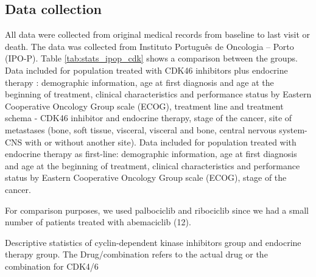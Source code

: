 \subsection{Data collection}
All data were collected from original medical records from baseline to last visit or death.
The data was collected from Instituto Português de Oncologia – Porto (IPO-P).  Table \ref{tab:stats_ipop_cdk} shows a comparison between the groups.
Data included for population treated with CDK4\/6 inhibitors plus endocrine therapy : demographic information, age at first diagnosis and age at the beginning of treatment, clinical characteristics and performance status by Eastern Cooperative Oncology Group scale (ECOG), treatment line and treatment schema -  CDK4\/6 inhibitor and endocrine therapy, stage of the cancer, site of metastases (bone, soft tissue, visceral, visceral and bone, central nervous system-CNS with or without another site).
Data included for population treated with endocrine therapy as first-line: demographic information, age at first diagnosis and age at the beginning of treatment, clinical characteristics and performance status by Eastern Cooperative Oncology Group scale (ECOG),  stage of the cancer.

For comparison purposes, we used palbociclib and ribociclib since we had a small number of patients treated with abemaciclib (12).

 
\begin{table}
\caption{Descriptive statistics of cyclin-dependent kinase inhibitors group and endocrine therapy group. The Drug/combination refers to the actual drug or the combination for CDK4/6}
\centering
\label{tab:stats_ipop_cdk}

\end{table}





